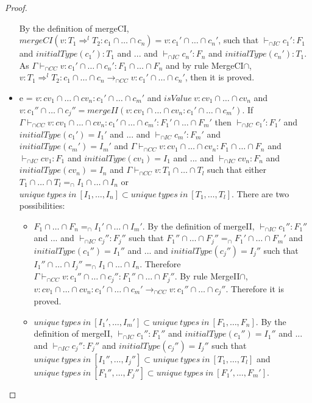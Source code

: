 \documentclass[a4paper]{article}
\begin{document}
\begin{proof}
\begin{itemize}
    By the definition of mergeCI, $mergeCI(v : T_1 \Rightarrow^l T_2 : c_1 \cap \ldots \cap c_n) = v : c_1' \cap \ldots \cap c_n'$, such that $\vdash_{\cap IC} c_1' : F_1$ and $initialType(c_1') : T_1$ and ... and $\vdash_{\cap IC} c_n' : F_n$ and $initialType(c_n') : T_1$.
    As $\Gamma \vdash_{\cap CC} v : c_1' \cap \ldots \cap c_n' : F_1 \cap \ldots \cap F_n$ and by rule MergeCI$\cap$, $v : T_1 \Rightarrow^l T_2 : c_1 \cap \ldots \cap c_n \longrightarrow_{\cap CC} v : c_1' \cap \ldots \cap c_n'$, then it is proved.
    \item e = $v : cv_1 \cap \ldots \cap cv_n : c_1' \cap \ldots \cap c_m'$ and $isValue\ v : cv_1 \cap \ldots \cap cv_n$ and $v : c_1'' \cap \ldots \cap c_j'' = mergeII(v : cv_1 \cap \ldots \cap cv_n : c_1' \cap \ldots \cap c_m')$.
    If $\Gamma \vdash_{\cap CC} v : cv_1 \cap \ldots \cap cv_n : c_1' \cap \ldots \cap c_m' : F_1' \cap \ldots \cap F_m'$ then $\vdash_{\cap IC} c_1' : F_1'$ and $initialType(c_1') = I_1'$ and ... and $\vdash_{\cap IC} c_m' : F_m'$ and $initialType(c_m') = I_m'$ and $\Gamma \vdash_{\cap CC} v : cv_1 \cap \ldots \cap cv_n : F_1 \cap \ldots \cap F_n$ and $\vdash_{\cap IC} cv_1 : F_1$ and $initialType(cv_1) = I_1$ and ... and $\vdash_{\cap IC} cv_n : F_n$ and $initialType(cv_n) = I_n$ and $\Gamma \vdash_{\cap CC} v : T_1 \cap \ldots \cap T_l$ such that either $T_1 \cap \ldots \cap T_l =_{\cap} I_1 \cap \ldots \cap I_n$ or $unique\ types\ in\ [I_1, \ldots, I_n] \subset unique\ types\ in\ [T_1, \ldots, T_l]$.
    There are two possibilities:
    \begin{itemize}
        \item $F_1 \cap \ldots \cap F_n =_{\cap} I_1' \cap \ldots \cap I_m'$.
        By the definition of mergeII, $\vdash_{\cap IC} c_1'' : F_1''$ and ... and $\vdash_{\cap IC} c_j'' : F_j''$ such that $F_1'' \cap \ldots \cap F_j'' =_{\cap} F_1' \cap \ldots \cap F_m'$ and $initialType(c_1'') = I_1''$ and ... and $initialType(c_j'') = I_j''$ such that $I_1'' \cap \ldots \cap I_j'' =_{\cap} I_1 \cap \ldots \cap I_n$.
        Therefore $\Gamma \vdash_{\cap CC} v : c_1'' \cap \ldots \cap c_j'' : F_1'' \cap \ldots \cap F_j''$.
        By rule MergeII$\cap$, $v : cv_1 \cap \ldots \cap cv_n : c_1' \cap \ldots \cap c_m' \longrightarrow_{\cap CC} v : c_1'' \cap \ldots \cap c_j''$.
        Therefore it is proved.
        \item $unique\ types\ in\ [I_1', \ldots, I_m'] \subset unique\ types\ in\ [F_1, \ldots, F_n]$.
        By the definition of mergeII, $\vdash_{\cap IC} c_1'' : F_1''$ and $initialType(c_1'') = I_1''$ and ... and $\vdash_{\cap IC} c_j'' : F_j''$ and $initialType(c_j'') = I_j''$ such that $unique\ types\ in\ [I_1'', \ldots, I_j''] \subset unique\ types\ in\ [T_1, \ldots, T_l]$ and $unique\ types\ in\ [F_1'', \ldots, F_j''] \subset unique\ types\ in\ [F_1', \ldots, F_m']$.

\end{itemize}
\end{itemize}
\end{proof}
\end{document}
